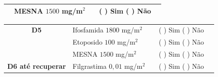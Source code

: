 \documentclass[11pt,a4paper,oldfontcommands]{memoir}
\begin{document}
\begin{center}
\begin{table}[H]
\begin{tabular}{c|p{5cm}|p{1.4cm}|p{4cm}|p{2.8cm}}
    \multicolumn{1}{c|}{\multirow{1}{*}{\textbf{}}}&{MESNA \(1500\) mg/m\(^2\)}&&{(  ) Sim (  ) Não}&\\
    \hline
\end{tabular}
\end{table}
\begin{table}[H]
\begin{tabular}{c|p{4cm}|p{1.3cm}|p{3cm}|p{2.7cm}}
   \hline
    \multicolumn{1}{c|}{\multirow{1}{*}{\textbf{D5}}}&{Ifosfamida \(1800\) mg/m\(^2\)}&&{(  ) Sim (  ) Não}&\\
    \multicolumn{1}{c|}{\multirow{1}{*}{\textbf{}}}&{Etoposido \(100\) mg/m\(^2\)}&&{(  ) Sim (  ) Não}&\\
    \multicolumn{1}{c|}{\multirow{1}{*}{\textbf{}}}&{MESNA \(1500\) mg/m\(^2\)}&&{(  ) Sim (  ) Não}&\\
    \multicolumn{1}{c|}{\multirow{1}{*}{\textbf{D6 até recuperar}}}&{Filgrastima \(0,01\) mg/m\(^2\)}&&{(  ) Sim (  ) Não}&\\


\end{tabular}
\end{table}
\end{center}
\end{document}
